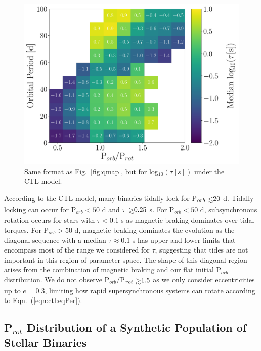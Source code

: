 \documentclass[twocolumn]{aastex61}
\def\gsim{~\rlap{$>$}{\lower 1.0ex\hbox{$\sim$}}}
\def\lsim{~\rlap{$<$}{\lower 1.0ex\hbox{$\sim$}}}
\begin{document}
\begin{figure}
	\includegraphics[width=\textwidth]{../Plots/porbProtPorbTauHist.pdf}
   \caption{Same format as Fig.~\ref{fig:qmap}, but for log$_{10}(\tau [s])$ under the CTL model. }%
    \label{fig:taumap}%
\end{figure}

According to the CTL model, many binaries tidally-lock for P$_{orb} \lsim 20$ d. Tidally-locking can occur for P$_{orb} < 50$ d and $\tau \gsim 0.25$ s.  For P$_{orb} < 50$ d, subsynchronous rotation occurs for stars with $\tau < 0.1$ s as magnetic braking dominates over tidal torques.  For P$_{orb} > 50$ d, magnetic braking dominates the evolution as the diagonal sequence with a median $\tau \approx 0.1$ s has upper and lower limits that encompass most of the range we considered for $\tau$, suggesting that tides are not important in this region of parameter space.  The shape of this diagonal region arises from the combination of magnetic braking and our flat initial P$_{orb}$ distribution. We do not observe P$_{orb}/$P$_{rot} \gsim 1.5$ as we only consider eccentricities up to $e = 0.3$, limiting how rapid supersynchronous systems can rotate according to Eqn.~(\ref{eqn:ctl:eqPer}).

\subsection{P$_{rot}$ Distribution of a Synthetic Population of Stellar Binaries} \label{sec:protDist}
\end{document}
